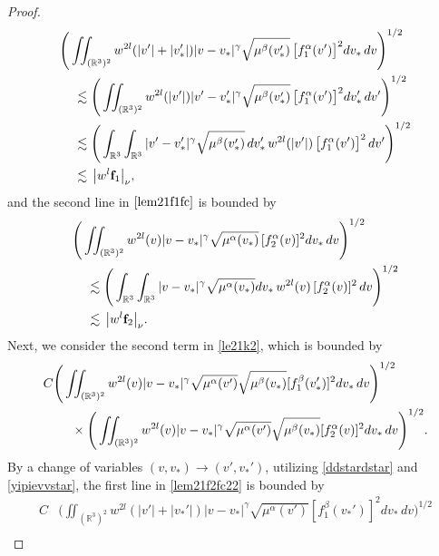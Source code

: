 \documentclass[reqno]{amsart}
\numberwithin{equation}{section}
\numberwithin{equation}{section}
\begin{document}
\begin{proof}
	\begin{align*}
		&\Bigg(\iint_{(\mathbb{R}^3)^2 }w^{2l}(|v'|+|v_*'|)|v-v_*|^{\gamma}\sqrt{\mu^{\beta}(v_*')} \, \big[f^\alpha_1(v')\big]^2dv_*\,dv \Bigg)^{1/2} \\
		&\hspace{0.4cm}\lesssim \Bigg(\iint_{(\mathbb{R}^3)^2 }w^{2l}(|v'|)|v'-v_*'|^{\gamma}\sqrt{\mu^{\beta}(v_*')} \, \big[f^\alpha_1(v')\big]^2dv_*'\,dv' \Bigg)^{1/2}\\
		&\hspace{0.4cm}\lesssim \Bigg(\int_{\mathbb{R}^3}\int_{\mathbb{R}^3}|v'-v_*'|^{\gamma}\sqrt{\mu^{\beta}(v_*')}\, dv_*'\,w^{2l}(|v'|) \, \big[f^\alpha_1(v')\big]^2\,dv' \Bigg)^{1/2}\\
		&\hspace{0.4cm}\lesssim \, \big|w^{l}\mathbf{f}_1\big|_{\nu},
	\end{align*}
	 and the second line in $\eqref{lem21f1fc}$ is bounded by 
	\begin{align*}
		&\Bigg(\iint_{(\mathbb{R}^3)^2}w^{2l}(v)|v-v_*|^{\gamma} \sqrt{\mu^{\alpha}(v_*)}\, [f^\alpha_2(v)]^2dv_*\,dv \Bigg)^{1/2} \\
		&\hspace{0.4cm}\lesssim \Bigg( \int_{\mathbb{R}^3}\int_{\mathbb{R}^3}|v-v_*|^{\gamma}\sqrt{\mu^{\alpha}(v_*)}dv_* \, w^{2l}(v) \, [f^\alpha_2(v)]^2\,dv\Bigg)^{1/2}\\
		&\hspace{0.4cm}\lesssim \, \big|w^{l}\mathbf{f}_2\big|_{\nu}.
	\end{align*}
	Next, we consider the second term in \eqref{le21k2}, which is bounded by
	\begin{gather}\label{lem21f2fc22}
		\begin{aligned}
			C&\Bigg(\iint_{(\mathbb{R}^3)^2 }w^{2l}(v)|v-v_*|^{\gamma}\sqrt{\mu^\alpha(v')}\sqrt{\mu^\beta(v_*)}[f^\beta_1(v_*')]^2dv_*\,dv \Bigg)^{1/2} \\
			&\hspace{0.5cm}\times \Bigg(\iint_{(\mathbb{R}^3)^2 }w^{2l}(v)|v-v_*|^{\gamma}\sqrt{\mu^\alpha(v')}\sqrt{\mu^\beta(v_*)}[f^\alpha_2(v)]^2dv_*\,dv \Bigg)^{1/2}.
		\end{aligned}
	\end{gather}
	By a change of variables $(v,v_*)\rightarrow(v',v_*')$, utilizing \eqref{ddstardstar} and \eqref{yipievvstar}, the first line in \eqref{lem21f2fc22} is bounded by
	\begin{equation*}
	\begin{aligned}
		C&\Bigg(\iint_{(\mathbb{R}^3)^2 }w^{2l}(|v'|+|v_*'|)|v-v_*|^{\gamma}\sqrt{\mu^\alpha(v')}[f^\beta_1(v_*')]^2dv_*\,dv \Bigg)^{1/2} \\

\end{aligned}
\end{equation*}
\end{proof}
\end{document}
